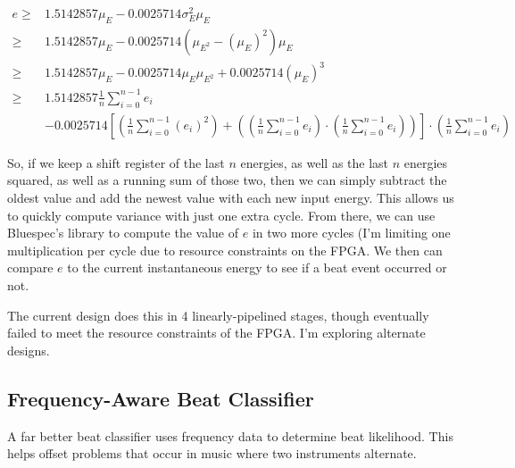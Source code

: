 \documentclass[letterpaper]{article}
\begin{document}
        \begin{align}
            e \geq & 1.5142857 \mu_E  - 0.0025714 \sigma^2_E \mu_E \\
            \geq & 1.5142857 \mu_E
                    - 0.0025714 (\mu_{E^2} - (\mu_E)^2) \mu_E \\
            \geq & 1.5142857 \mu_E
                    - 0.0025714 \mu_E \mu_{E^2} 
                    + 0.0025714 (\mu_E)^3 \\
            \geq & 1.5142857 \frac{1}{n} \sum_{i=0}^{n-1} e_i \\
                & - 0.0025714 \left[
                                    \left(\frac{1}{n} \sum_{i=0}^{n-1} (e_i)^2\right) +
                                    \left(
                                        \left(\frac{1}{n} \sum_{i=0}^{n-1} e_i\right) \cdot
                                        \left(\frac{1}{n} \sum_{i=0}^{n-1} e_i\right)
                                    \right)
                                \right] \cdot
                                \left(\frac{1}{n} \sum_{i=0}^{n-1} e_i\right)
        \end{align}


        So, if we keep a shift register of the last $n$ energies, as well as the
        last $n$ energies squared, as well as a running sum of those two, then we
        can simply subtract the oldest value and add the newest value with each new
        input energy.  This allows us to quickly compute variance with just one
        extra cycle.  From there, we can use Bluespec's  library to
        compute the value of $e$ in two more cycles (I'm limiting one
        multiplication per cycle due to resource constraints on the FPGA.  We then
        can compare $e$ to the current instantaneous energy to see if a beat event
        occurred or not.

        The current design does this in 4 linearly-pipelined stages, though
        eventually failed to meet the resource constraints of the FPGA.  I'm
        exploring alternate designs.

    \subsection{Frequency-Aware Beat Classifier}

        A far better beat classifier uses frequency data to determine beat
        likelihood.  This helps offset problems that occur in music where two
        instruments alternate.
\end{document}
